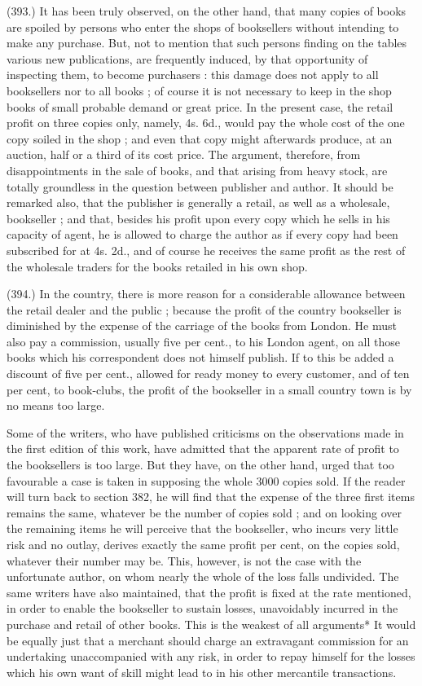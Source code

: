 \documentclass{article}
\begin{document}
(393.) It has been truly observed, on the other hand, that many copies of books are spoiled by persons who enter the shops of booksellers without intending to make any purchase. But, not to mention that such persons finding on the tables various new publications, are frequently induced, by that opportunity of inspecting them, to become purchasers : this damage does not apply to all booksellers nor to all books ; of course it is not necessary to keep in the shop books of small probable demand or great price. In the present case, the retail profit on three copies only, namely, 4s. 6d., would pay the whole cost of the one copy soiled in the shop ; and even that copy might afterwards produce, at an auction, half or a third of its cost price. The argument, therefore, from disappointments in the sale of books, and that arising from heavy stock, are totally groundless in the question between publisher and author. It should be remarked also, that the publisher is generally a retail, as well as a wholesale, bookseller ; and that, besides his profit upon every copy which he sells in his capacity of agent, he is allowed to charge the author as if every copy had been subscribed for at 4s. 2d., and of course he receives the same profit as the rest of the wholesale traders for the books retailed in his own shop.


(394.) In the country, there is more reason for a considerable allowance between the retail dealer and the public ; because the profit of the country bookseller is diminished by the expense of the carriage of the books from London. He must also pay a commission, usually five per cent., to his London agent, on all those books which his correspondent does not himself publish. If to this be added a discount of five per cent., allowed for ready money to every customer, and of ten per cent, to book-clubs, the profit of the bookseller in a small country town is by no means too large.


Some of the writers, who have published criticisms on the observations made in the first edition of this work, have admitted that the apparent rate of profit to the booksellers is too large. But they have, on the other hand, urged that too favourable a case is taken in supposing the whole 3000 copies sold. If the reader will turn back to section 382, he will find that the expense of the three first items remains the same, whatever be the number of copies sold ; and on looking over the remaining items he will perceive that the bookseller, who incurs very little risk and no outlay, derives exactly the same profit per cent, on the copies sold, whatever their number may be. This, however, is not the case with the unfortunate author, on whom nearly the whole of the loss falls undivided. The same writers have also maintained, that the profit is fixed at the rate mentioned, in order to enable the bookseller to sustain losses, unavoidably incurred in the purchase and retail of other books. This is the weakest of all arguments* It would be equally just that a merchant should charge an extravagant commission for an undertaking unaccompanied with any risk, in order to repay himself for the losses which his own want of skill might lead to in his other mercantile transactions.
\end{document}
